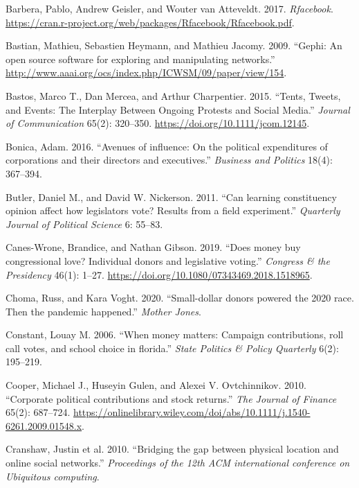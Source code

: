 \documentclass[12pt,]{article}
\begin{document}
\leavevmode\hypertarget{ref-rfacebook}{}%
Barbera, Pablo, Andrew Geisler, and Wouter van Atteveldt. 2017.
\emph{Rfacebook}.
\url{https://cran.r-project.org/web/packages/Rfacebook/Rfacebook.pdf}.

\leavevmode\hypertarget{ref-gephi}{}%
Bastian, Mathieu, Sebastien Heymann, and Mathieu Jacomy. 2009. ``Gephi:
An open source software for exploring and manipulating networks.''
\url{http://www.aaai.org/ocs/index.php/ICWSM/09/paper/view/154}.

\leavevmode\hypertarget{ref-bastos2015}{}%
Bastos, Marco T., Dan Mercea, and Arthur Charpentier. 2015. ``Tents,
Tweets, and Events: The Interplay Between Ongoing Protests and Social
Media.'' \emph{Journal of Communication} 65(2): 320--350.
\url{https://doi.org/10.1111/jcom.12145}.

\leavevmode\hypertarget{ref-bonica2016}{}%
Bonica, Adam. 2016. ``Avenues of influence: On the political
expenditures of corporations and their directors and executives.''
\emph{Business and Politics} 18(4): 367--394.

\leavevmode\hypertarget{ref-butler2011}{}%
Butler, Daniel M., and David W. Nickerson. 2011. ``Can learning
constituency opinion affect how legislators vote? Results from a field
experiment.'' \emph{Quarterly Journal of Political Science} 6: 55--83.

\leavevmode\hypertarget{ref-caneswrone2019}{}%
Canes-Wrone, Brandice, and Nathan Gibson. 2019. ``Does money buy
congressional love? Individual donors and legislative voting.''
\emph{Congress \& the Presidency} 46(1): 1--27.
\url{https://doi.org/10.1080/07343469.2018.1518965}.

\leavevmode\hypertarget{ref-choma2020}{}%
Choma, Russ, and Kara Voght. 2020. ``Small-dollar donors powered the
2020 race. Then the pandemic happened.'' \emph{Mother Jones}.

\leavevmode\hypertarget{ref-constant2006}{}%
Constant, Louay M. 2006. ``When money matters: Campaign contributions,
roll call votes, and school choice in florida.'' \emph{State Politics \&
Policy Quarterly} 6(2): 195--219.

\leavevmode\hypertarget{ref-cooper2010}{}%
Cooper, Michael J., Huseyin Gulen, and Alexei V. Ovtchinnikov. 2010.
``Corporate political contributions and stock returns.'' \emph{The
Journal of Finance} 65(2): 687--724.
\url{https://onlinelibrary.wiley.com/doi/abs/10.1111/j.1540-6261.2009.01548.x}.

\leavevmode\hypertarget{ref-cranshaw2010}{}%
Cranshaw, Justin et al. 2010. ``Bridging the gap between physical
location and online social networks.'' \emph{Proceedings of the 12th ACM
international conference on Ubiquitous computing}.
\end{document}
